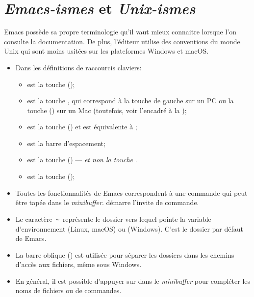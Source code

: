 \section{\emph{Emacs-ismes} et \emph{Unix-ismes}}
\label{sec:emacs+ess:ismes}

Emacs possède sa propre terminologie qu'il vaut mieux connaitre
lorsque l'on consulte la documentation. De plus, l'éditeur utilise des
conventions du monde Unix qui sont moins usitées sur les plateformes
Windows et macOS.

\begin{itemize}
\item Dans les définitions de raccourcis claviers:
  \begin{itemize}
  \item {} est la touche  (\ctlkey);
  \item {} est la touche , qui correspond à la touche
     de gauche sur un PC ou la touche 
    (\optkey) sur un Mac (toutefois, voir l'encadré à la
    );
  \item {} est la touche  (\esckey) et
    est équivalente à ;
  \item {} est la barre d'espacement;
  \item {} est la touche  (\delkey) ---
    \emph{et non la touche} .
  \item {} est la touche  (\returnkey);
  \end{itemize}
\item Toutes les fonctionnalités de Emacs correspondent à une commande
  qui peut être tapée dans le \emph{minibuffer}.  démarre
  l'invite de commande.
\item Le caractère \,\verb=~=\, représente le dossier vers lequel
  pointe la variable d'environnement  (Linux, macOS) ou
   (Windows). C'est le dossier par défaut de Emacs.
\item La barre oblique (\code{/}) est utilisée pour séparer les
  dossiers dans les chemins d'accès aux fichiers, même sous Windows.
\item En général, il est possible d'appuyer sur  dans le
  \emph{minibuffer} pour compléter les noms de fichiers ou de
  commandes.
\end{itemize}

